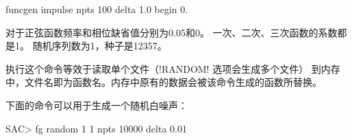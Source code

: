 \begin{SACDFT}
funcgen impulse npts 100 delta 1.0 begin 0.
\end{SACDFT}
对于正弦函数频率和相位缺省值分别为0.05和0。
一次、二次、三次函数的系数都是1。
随机序列数为1，种子是12357。

执行这个命令等效于读取单个文件（!RANDOM! 选项会生成多个文件）
到内存中，文件名即为函数名。内存中原有的数据会被该命令生成的函数所替换。

下面的命令可以用于生成一个随机白噪声：
\begin{SACCode}
SAC> fg random 1 1 npts 10000 delta 0.01
\end{SACCode}
